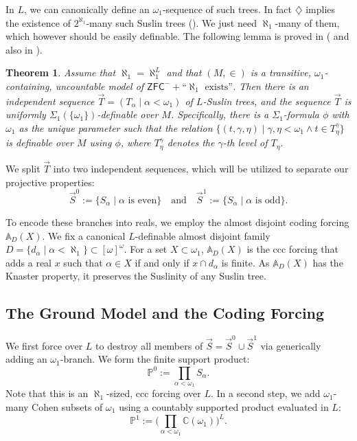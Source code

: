 \documentclass{article}
\theoremstyle{plain}
\newtheorem{theorem}{Theorem}[section]
\theoremstyle{definition}
\begin{document}
In $L$, we can canonically define an $\omega_1$-sequence of such trees. In fact $\diamondsuit$ implies the existence of $2^{\aleph_1}$-many such Suslin trees (\cite{zakrzewski1981weak}). We just need $\aleph_1$-many of them, which however should be easily definable. The following lemma is proved in (\cite{hoffelner2026failurepi1n3reductionpresencesigma1n3separation} and also in \cite{hoffelner2025universelargecontinuumglobal}).

\begin{theorem} \label{DefinitionIndependentSequence}
Assume that $\aleph_1 = \aleph_1^L$ and that $(M, \in)$ is a transitive, $\omega_1$-containing, uncountable model of $\mathsf{ZFC}^- + \text{``}\aleph_1 \text{ exists''}$. Then there is an independent sequence $\vec{T} = (T_\alpha \mid \alpha < \omega_1)$ of $L$-Suslin trees, and the sequence $\vec{T}$ is uniformly $\Sigma_1(\{\omega_1\})$-definable over $M$. Specifically, there is a $\Sigma_1$-formula $\phi$ with $\omega_1$ as the unique parameter such that the relation $\{(t, \gamma, \eta) \mid \gamma, \eta < \omega_1 \land t \in T_\eta^\gamma\}$ is definable over $M$ using $\phi$, where $T_\eta^\gamma$ denotes the $\gamma$-th level of $T_\eta$.
\end{theorem}

We split $\vec{T}$ into two independent sequences, which will be utilized to separate our projective properties:
\[ \vec{S}^0 := \{ S_\alpha \mid \alpha \text{ is even}\} \quad \text{and} \quad \vec{S}^1 := \{ S_\alpha \mid \alpha \text{ is odd}\}. \]

To encode these branches into reals, we employ the almost disjoint coding forcing $\mathbb{A}_D(X)$. We fix a canonical $L$-definable almost disjoint family $D = \{d_\alpha \mid \alpha < \aleph_1\} \subset [\omega]^\omega$. For a set $X \subset \omega_1$, $\mathbb{A}_D(X)$ is the ccc forcing that adds a real $x$ such that $\alpha \in X$ if and only if $x \cap d_\alpha$ is finite. As $\mathbb{A}_D(X)$ has the Knaster property, it preserves the Suslinity of any Suslin tree.

\subsection{The Ground Model and the Coding Forcing}
We first force over $L$ to destroy all members of $\vec{S} = \vec{S}^0 \cup \vec{S}^1$ via generically adding an $\omega_1$-branch. We form the finite support product:
\[ \mathbb{P}^0 := \prod_{\alpha < \omega_1} S_\alpha. \]
Note that this is an $\aleph_1$-sized, ccc forcing over $L$. In a second step, we add $\omega_1$-many Cohen subsets of $\omega_1$ using a countably supported product evaluated in $L$: 
\[ \mathbb{P}^1 := \Big(\prod_{\alpha < \omega_1} \mathbb{C}(\omega_1)\Big)^L. \]
\end{document}
